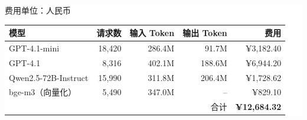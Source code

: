 \documentclass{article}
\begin{document}
\vspace{13mm}\noindent\hspace*{12mm}\colorbox{white}{\begin{minipage}{256mm}\vspace{4mm}\hfill{\color{gray}\small 费用单位：人民币}\par\vspace{3mm}\centering\small\renewcommand{\arraystretch}{1.35}\begin{tabular}{p{48mm}r r r r}\toprule 模型 & 请求数 & 输入 Token & 输出 Token & 费用\\\midrule GPT-4.1-mini & 18,420 & 286.4M & 91.7M & ¥3,182.40\\ GPT-4.1 & 8,316 & 402.1M & 188.6M & ¥6,944.20\\ Qwen2.5-72B-Instruct & 15,990 & 311.8M & 206.4M & ¥1,728.62\\ bge-m3（向量化） & 5,490 & 347.0M & -- & ¥829.10\\\midrule \multicolumn{4}{r}{合计} & {\bfseries ¥12,684.32}\\\bottomrule\end{tabular}\vspace{5mm}\end{minipage}}
\vspace{8mm}
\end{document}
